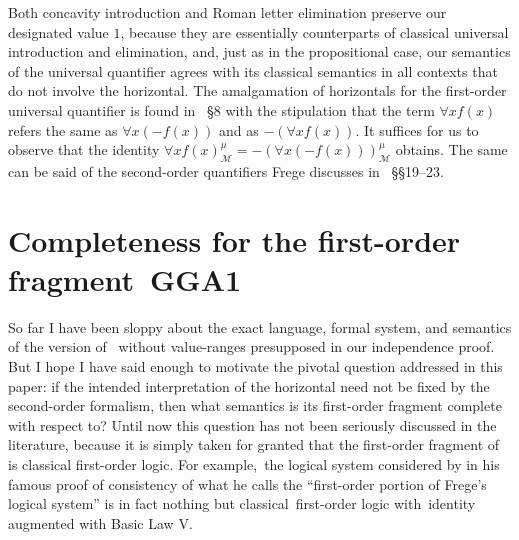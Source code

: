 \documentclass{preprint}
\newcommand{\GGA}{\textsf{GGA1}}
\begin{document}
Both concavity
introduction and Roman letter elimination preserve our designated value $1$,
because they are essentially counterparts of classical universal introduction and elimination, and, just as in the propositional case, our semantics of the universal quantifier agrees with its classical semantics in all contexts that do not involve the horizontal. 
The amalgamation of horizontals for the first-order universal quantifier is found in \gga~\S8 with the stipulation that the term $\forall x f(x)$ refers the same as $\forall x (- f(x))$ and as $-(\forall x f(x))$. It suffices for us to observe that the identity $\forall x f(x)^\mu_{\mathcal{M}} = - (\forall x (- f(x)))^\mu_{\mathcal{M}}$ obtains. The same can be said of the second-order quantifiers Frege discusses in \gga~\S\S19--23. 


\section{Completeness for the first-order fragment~\GGA} \label{sec:completeness}


So far I have been sloppy about the exact language, formal system, and semantics of the version of \gga~without value-ranges presupposed in our independence proof. But I hope I have said enough to motivate the pivotal question addressed in this paper: if the intended interpretation of the horizontal need not be fixed by the second-order formalism, then what semantics is its first-order fragment complete with respect to? 
Until now this question has not been seriously discussed in the literature, because it is simply taken for granted that the first-order fragment of {\gga} is classical first-order logic. 
For example,~the logical system considered by \cite{parsons1987consistency} in his famous proof of consistency of what he calls the ``first-order portion
of Frege's logical system'' is in fact nothing but classical~first-order logic with~identity augmented with Basic Law V. 
\end{document}
